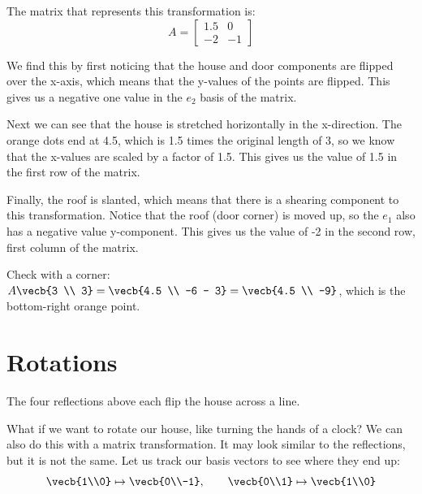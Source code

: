 \begin{Answer}[ref={ex:guess_transform}]
    The matrix that represents this transformation is:
    \[A = \begin{bmatrix} 1.5 & 0 \\ -2 & -1 \end{bmatrix}\]

    We find this by first noticing that the house and door components are flipped over the x-axis, which means that the y-values of the points are flipped. This gives us a negative one value in the $e_2$ basis of the matrix.

    Next we can see that the house is stretched horizontally in the x-direction. The orange dots end at 4.5, which is 1.5 times the original length of 3, so we know that the x-values are scaled by a factor of 1.5. This gives us the value of 1.5 in the first row of the matrix.

    Finally, the roof is slanted, which means that there is a shearing component to this transformation. Notice that the roof (door corner) is moved up, so the $e_1$ also has a negative value y-component. This gives us the value of -2 in the second row, first column of the matrix. 

    Check with a corner: $A\vecb{3 \\ 3} = \vecb{4.5 \\ -6 - 3} = \vecb{4.5 \\ -9}$, which is the bottom-right orange point.

\end{Answer}
\section{Rotations}

The four reflections above each flip the house across a line.

What if we want to rotate our house, like turning the hands of a clock? We can also do this with a matrix transformation. It may look similar to the reflections, but it is not the same. Let us track our basis vectors to see where they end up:
$$\vecb{1\\0}\mapsto\vecb{0\\-1}, \qquad \vecb{0\\1}\mapsto\vecb{1\\0}$$

